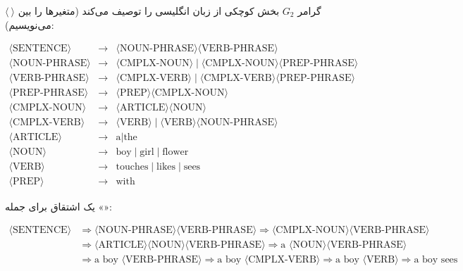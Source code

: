\begin{example}
گرامر $G_2$ بخش کوچکی از زبان انگلیسی را توصیف می‌کند (متغیرها را بین $\langle\ \rangle$ می‌نویسیم):
\begin{ltrfig}
\small$\begin{array}{rcl}
\langle\text{SENTENCE}\rangle&\to&\langle\text{NOUN-PHRASE}\rangle\langle\text{VERB-PHRASE}\rangle\\
\langle\text{NOUN-PHRASE}\rangle&\to&\langle\text{CMPLX-NOUN}\rangle\mid\langle\text{CMPLX-NOUN}\rangle\langle\text{PREP-PHRASE}\rangle\\
\langle\text{VERB-PHRASE}\rangle&\to&\langle\text{CMPLX-VERB}\rangle\mid\langle\text{CMPLX-VERB}\rangle\langle\text{PREP-PHRASE}\rangle\\
\langle\text{PREP-PHRASE}\rangle&\to&\langle\text{PREP}\rangle\langle\text{CMPLX-NOUN}\rangle\\
\langle\text{CMPLX-NOUN}\rangle&\to&\langle\text{ARTICLE}\rangle\langle\text{NOUN}\rangle\\
\langle\text{CMPLX-VERB}\rangle&\to&\langle\text{VERB}\rangle\mid\langle\text{VERB}\rangle\langle\text{NOUN-PHRASE}\rangle\\
\langle\text{ARTICLE}\rangle&\to&\text{a}\mid\text{the}\\
\langle\text{NOUN}\rangle&\to&\text{boy}\mid\text{girl}\mid\text{flower}\\
\langle\text{VERB}\rangle&\to&\text{touches}\mid\text{likes}\mid\text{sees}\\
\langle\text{PREP}\rangle&\to&\text{with}
\end{array}$
\end{ltrfig}
یک اشتقاق برای جمله «»:
\begin{ltrfig}
\small$\begin{array}{rl}
\langle\text{SENTENCE}\rangle&\Rightarrow\langle\text{NOUN-PHRASE}\rangle\langle\text{VERB-PHRASE}\rangle
\Rightarrow\langle\text{CMPLX-NOUN}\rangle\langle\text{VERB-PHRASE}\rangle\\
&\Rightarrow\langle\text{ARTICLE}\rangle\langle\text{NOUN}\rangle\langle\text{VERB-PHRASE}\rangle
\Rightarrow\text{a }\langle\text{NOUN}\rangle\langle\text{VERB-PHRASE}\rangle\\
&\Rightarrow\text{a boy }\langle\text{VERB-PHRASE}\rangle\Rightarrow\text{a boy }\langle\text{CMPLX-VERB}\rangle
\Rightarrow\text{a boy }\langle\text{VERB}\rangle\Rightarrow\text{a boy sees}
\end{array}$
\end{ltrfig}
\end{example}

